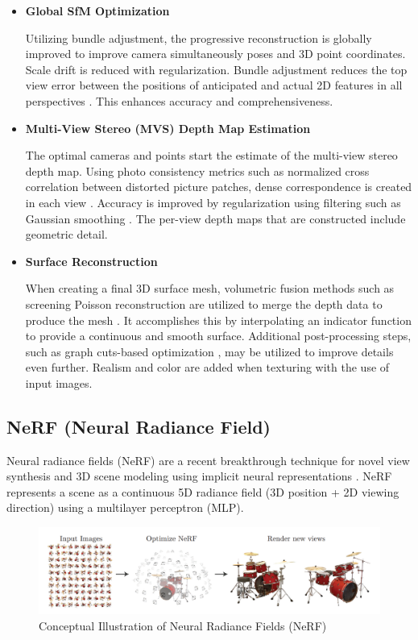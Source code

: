 \begin{itemize}
  \item \textbf{Global SfM Optimization}
    
     Utilizing bundle adjustment, the progressive reconstruction is globally improved to improve camera simultaneously poses and 3D point coordinates. Scale drift is reduced with regularization. Bundle adjustment reduces the top view error between the positions of anticipated and actual 2D features in all perspectives \cite{Heinly}. This enhances accuracy and comprehensiveness.
    
  \item \textbf{Multi-View Stereo (MVS) Depth Map Estimation}
    
     The optimal cameras and points start the estimate of the multi-view stereo depth map. Using photo consistency metrics such as normalized cross correlation between distorted picture patches, dense correspondence is created in each view \cite{Triggs}. Accuracy is improved by regularization using filtering such as Gaussian smoothing \cite{Galliani}. The per-view depth maps that are constructed include geometric detail.
    
  \item \textbf{Surface Reconstruction}
    
      When creating a final 3D surface mesh, volumetric fusion methods such as screening Poisson reconstruction are utilized to merge the depth data to produce the mesh \cite{Facciolo2015}. It accomplishes this by interpolating an indicator function to provide a continuous and smooth surface. Additional post-processing steps, such as graph cuts-based optimization \cite{Kazhdan}, may be utilized to improve details even further. Realism and color are added when texturing with the use of input images.
     
  
\end{itemize}

\clearpage
\subsection{NeRF (Neural Radiance Field)}

Neural radiance fields (NeRF) are a recent breakthrough technique for novel view synthesis and 3D scene modeling using implicit neural representations \cite{Mildenhall2020}. NeRF represents a scene as a continuous 5D radiance field (3D position + 2D viewing direction) using a multilayer perceptron (MLP).
\vspace{10pt}

\begin{figure}[thbp]
\centering
\includegraphics[width=1\textwidth]{img/NERF.png}
\caption{Conceptual Illustration of Neural Radiance Fields (NeRF) \cite{Mildenhall2020}}\label{fig:Conceptual Illustration of Neural Radiance Fields (NeRF)}
\end{figure}

